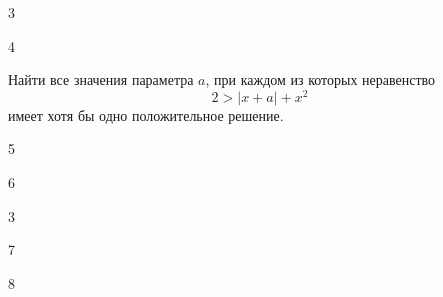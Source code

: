 \begin{class}[number=3]
	\begin{listofex}
		\item 3
	\end{listofex}
\end{class}

\begin{class}[number=4]
	\begin{listofex}
		\item 4
	\end{listofex}
\end{class}

\begin{homework}[number=2]
	\begin{listofex}
		\item Найти все значения параметра \( a \), при каждом из которых неравенство
		\[ 2 > |x+a|+x^2 \]
		имеет хотя бы одно положительное решение.
	\end{listofex}
\end{homework}

\begin{class}[number=5]
	\begin{listofex}
		\item 5
	\end{listofex}
\end{class}

\begin{class}[number=6]
	\begin{listofex}
		\item 6
	\end{listofex}
\end{class}

\begin{homework}[number=2]
	\begin{listofex}
		\item 3
	\end{listofex}
\end{homework}

\begin{class}[number=7]
	\begin{listofex}
		\item 7
	\end{listofex}
\end{class}

\begin{class}[number=8]
	\begin{listofex}
		\item 8
	\end{listofex}
\end{class}

